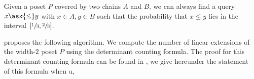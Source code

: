 \begin{theorem}
Given a poset \(P\) covered by two chains \(A\) and \(B\), we can always find
a query \(x \ask{\le} y\) with \(x \in A, y \in B\) such that the probability
that \(x \le y\) lies in the interval \([\sfrac{1}{3}, \sfrac{2}{3}]\).
\end{theorem}

\citet*{linial:1984} proposes the following algorithm. We compute the number of
linear extensions of the width-\(2\) poset \(P\) using the determinant
counting formula. The proof for this determinant counting formula can be found in
\citet*{mohanty:1979}, we give hereunder the statement of this formula when u,



